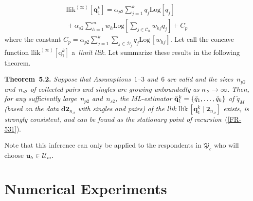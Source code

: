 \begin{multicols}{2}
 \noindent
\begin{multline*}
\mathrm{llik}^{(\infty )} \left[\mathbf{q}_1^k\right] = 
\alpha_{p2} \sum\limits_{j=1}^k q_{j} \mathrm{Log} \left[q_j\right]\\
{} + \alpha_{s2} \sum\limits_{h=1}^m w_{h} \mathrm{Log}\left [
\sum\limits_{j\in\mathcal{C}_h} w_{hj}q_j \right ]+ C_p
\end{multline*}
where the constant  $C_p =\alpha_{p2} \sum_{j=1}^k
\sum_{j\in\mathcal{D}_j}q_{j} \mathrm{Log}\,[w_{hj}].$
 Let call the concave function $\mathrm{llik}^{(\infty )}[\mathrm{q}_1^k]$  
 a~\textit{limit llik.}
 Let summarize these results in the following theorem.

\smallskip

\noindent
\textbf{Theorem~5.2.}
\textit{Suppose that   Assumptions~$1$--$3$ and~$6$
 are valid and  the sizes~$n_{p2}$ and~$n_{s2}$ of collected pairs and singles are
growing unboundedly as $n_{\cdot 2}\to\infty$.
  Then, for any sufficiently large~$n_{p2}$ and~$n_{s2}$, the 
  ML-estimator $\check{\bf q}_1^{k} = \{ \check q_{1},
\ldots, \check q_{k}\}$ of $ \check{q}_M$ (based on the data $\mathbf{d2}_{n_{\cdot 2}}$
with singles and pairs) of the llik 
$\mathrm{llik}\,[\mathbf{q}_1^k \mid \mathbf{2}_{n_{\cdot 2}}]$
exists, is strongly consistent, and can be found as the stationary
point of recursion}~(\ref{FR-531}).


\smallskip

      Note  that this inference can  only be applied to the respondents
  in $\mathfrak{P}_c$ who will choose $\mathbf{u}_h \in \mathcal{U}_m$.
  
  \vspace*{-6pt}


\section{Numerical Experiments}


\end{multicols}
